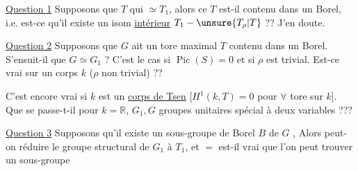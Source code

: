 \uline{Question 1} Supposons que  $T$ qui  $\simeq T_1$, alors ce $T$ est-il contenu dans un Borel, i.e. est-ce qu'il existe un isom \uline{intérieur} $T_1-\unsure{T_\rho|T}$ ??
J'en doute.

\uline{Question 2} Supposons que  $G$ ait un  tore maximal $T$ contenu dans un Borel. S'ensuit-il que $G\simeq G_1$ ?   C'est le cas si $\operatorname{Pic}(S)=0$  et si $\rho$  est trivial. Est-ce vrai sur un corps $k$ ($\rho$ non trivial) ??


 C'est encore vrai si $k$ est un \uline{corps de Tsen}
[$H^1(k,T)=0$ pour \uline{$\forall$} tore sur $k$]. Que se passe-t-il pour $k=\mathbb R$,  $G_1,G$ groupes  unitaires spécial à deux variables ???


\deleted{\unsure{\S}}
\uline{Question 3} Supposons qu'il existe un sous-groupe de Borel $B$ de $G$ , Alors peut-on réduire le groupe structural  de $G_1$ à $T_1$, et $=$ est-il vrai que  l'on peut trouver un sous-groupe

